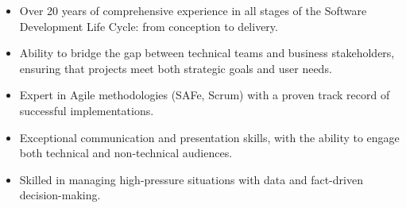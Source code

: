 \documentclass[10pt,a4paper]{altacv}
\begin{document}

\begin{fullwidth}
\makecvheader
\end{fullwidth}

\begin{itemize} 
	\item Over 20 years of comprehensive experience in all stages of the Software Development Life Cycle: from conception to delivery.
	\item Ability to bridge the gap between technical teams and business stakeholders, ensuring that projects meet both strategic goals and user needs.
	\item Expert in Agile methodologies (SAFe, Scrum) with a proven track record of successful implementations.	       
	\item Exceptional communication and presentation skills, with the ability to engage both technical and non-technical audiences.
	\item Skilled in managing high-pressure situations with data and fact-driven decision-making.
\end{itemize}
\end{document}
